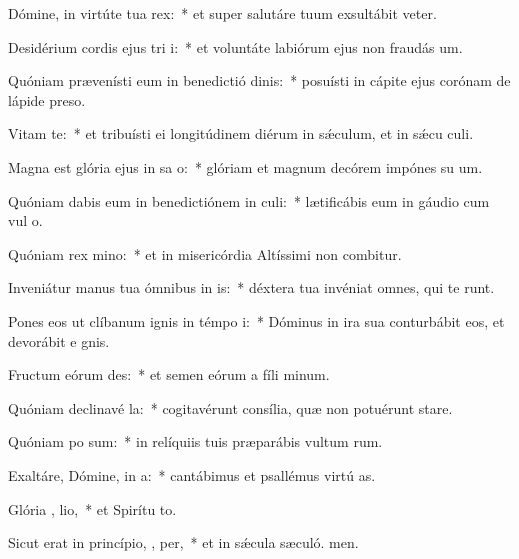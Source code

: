 \item Dómine, in virtúte tua  rex:~* et super salutáre tuum exsultábit veter.
\item Desidérium cordis ejus tri i:~* et voluntáte labiórum ejus non fraudás um.
\item Quóniam prævenísti eum in benedictió dinis:~* posuísti in cápite ejus corónam de lápide preso.
\item Vitam   te:~* et tribuísti ei longitúdinem diérum in sǽculum, et in sǽcu culi.
\item Magna est glória ejus in sa o:~* glóriam et magnum decórem impónes su um.
\item Quóniam dabis eum in benedictiónem in  culi:~* lætificábis eum in gáudio cum vul o.
\item Quóniam rex   mino:~* et in misericórdia Altíssimi non combitur.
\item Inveniátur manus tua ómnibus in is:~* déxtera tua invéniat omnes, qui te runt.
\item Pones eos ut clíbanum ignis in témpo  i:~* Dóminus in ira sua conturbábit eos, et devorábit e gnis.
\item Fructum eórum   des:~* et semen eórum a fíli minum.
\item Quóniam declinavé   la:~* cogitavérunt consília, quæ non potuérunt stare.
\item Quóniam po  sum:~* in relíquiis tuis præparábis vultum rum.
\item Exaltáre, Dómine, in  a:~* cantábimus et psallémus virtú as.
\item Glória ,  lio,~* et Spirítu to.
\item Sicut erat in princípio,  ,  per,~* et in sǽcula sæculó. men.
